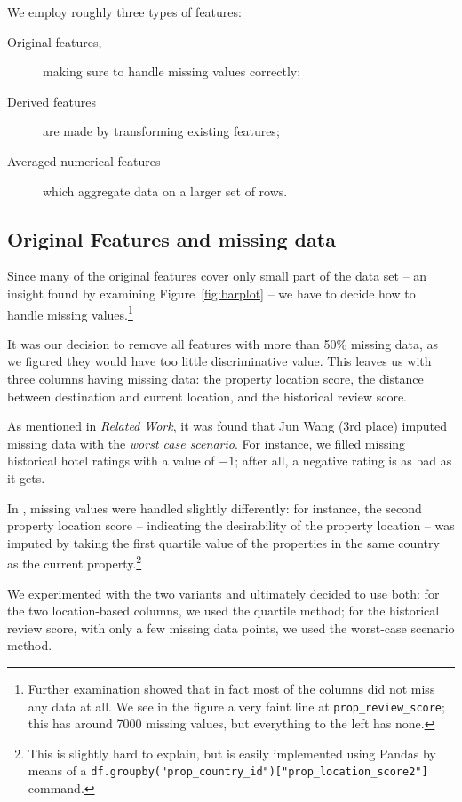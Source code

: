 \documentclass[runningheads,a4paper]{llncs}
\begin{document}
We employ roughly three types of features:
\begin{description}
  \item[Original features,] making sure to handle missing values correctly;
  \item[Derived features] are made by transforming existing features;
  \item[Averaged numerical features] which aggregate data on a larger set of rows.
\end{description}

\subsection{Original Features and missing data}
Since many of the original features cover only small part of the data set -- an 
insight found by examining Figure~\ref{fig:barplot} -- we have to decide how to 
handle missing values.\footnote{Further examination showed that in fact most of the
  columns did not miss any data at all. We see in the figure a very faint line at 
  \texttt{prop\_review\_score}; this has around 7000 missing values, but everything to the 
  left has none.}

It was our decision to remove all features with more than 50\% missing data, as 
we figured they would have too little discriminative value. This leaves us with
three columns having missing data: the property location score, the distance 
between destination and current location, and the historical review score.

As mentioned in \textit{Related Work}, it was found that Jun Wang (3rd place) imputed missing data with the 
\emph{worst case scenario}. For instance, we filled missing historical hotel ratings with a value of $-1$; after all, a negative rating is as bad as it gets.

In \cite{bing}, missing values were handled slightly differently: for 
instance, the second property location score -- indicating the desirability of 
the property location -- was imputed by taking the first quartile value of the
properties in the same country as the current property.\footnote{This is slightly
  hard to explain, but is easily implemented using Pandas\cite{pandas} by means
of a \texttt{df.groupby("prop\_country\_id")["prop\_location\_score2"]} command.}

We experimented with the two variants and ultimately decided to use both: for the
two location-based columns, we used the quartile method; for the historical review 
score, with only a few missing data points, we used the worst-case scenario method.
\end{document}
